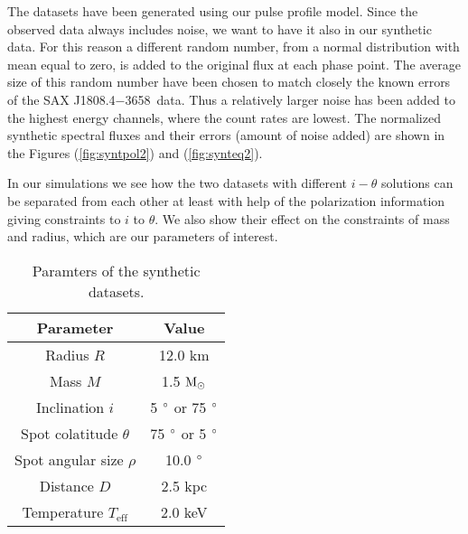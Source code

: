 \documentclass{wihuri}
\def\msun{{\rm M_{\odot}}}
\def\source{SAX J1808.4$-$3658}
\begin{document}
The datasets have been generated using our pulse profile model. Since the observed data always includes noise, we want to have it also in our synthetic data. For this reason a different random number, from a normal distribution with mean equal to zero, is added to the original flux at each phase point. The average size of this random number have been chosen to match closely the known errors of the \source \ data. Thus a relatively larger noise has been added to the highest energy channels, where the count rates are lowest. The normalized synthetic spectral fluxes and their errors (amount of noise added) are shown in the Figures (\ref{fig:syntpol2}) and (\ref{fig:synteq2}).





In our simulations we see how the two datasets with different $i-\theta$ solutions can be separated from each other at least with help of the polarization information giving constraints to $i$ to $\theta$. We also show their effect on the constraints of mass and radius, which are our parameters of interest. 




\begin{center}
\begin{table}
  \caption{Paramters of the synthetic datasets.}
\label{table:params}
\begin{center}
  \begin{tabular}{| c | c |}
    \hline
     Parameter & Value\\ \hline
      Radius $R$ & 12.0 km  \\ \hline
      Mass $M$ & 1.5 $\msun$  \\ \hline
      Inclination $i$ & 5 $\degree$ or 75 $\degree$ \\ \hline
      Spot colatitude $\theta$ & 75 $\degree$ or 5 $\degree$ \\ \hline
      Spot angular size $\rho$ & 10.0 $\degree$  \\ \hline
      Distance $D$ & 2.5 kpc \\ \hline
      Temperature $T_{\mathrm{eff}}$ & 2.0 keV \\

    \hline
  \end{tabular}
  \end{center} 

  \end{table}
\end{center} 
\end{document}

